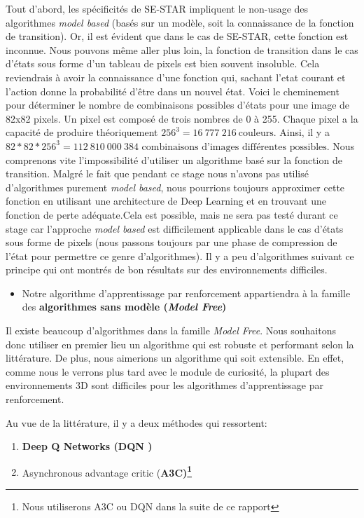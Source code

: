 Tout d'abord, les spécificités de SE-STAR impliquent le non-usage des algorithmes \emph{model based} (basés sur un modèle, soit la connaissance de la fonction de transition). Or, il est évident que dans le cas de SE-STAR, cette fonction est inconnue. Nous pouvons même aller plus loin, la fonction de transition dans le cas d'états sous forme d'un tableau de pixels est bien souvent insoluble. Cela reviendrais à avoir la connaissance d'une fonction qui, sachant l'etat courant et l'action donne la probabilité d'être dans un nouvel état. Voici le cheminement pour déterminer le nombre de combinaisons possibles d'états pour une image de 82x82 pixels. Un pixel est composé de trois nombres de 0 à 255. Chaque pixel a la capacité de produire théoriquement $256^3 = 16\ 777\ 216\ \text{couleurs}$. Ainsi, il y a $82 * 82 * 256^3 = 112\ 810\ 000\ 384 \text{ combinaisons d'images différentes possibles}$. Nous comprenons vite l'impossibilité d'utiliser un algorithme basé sur la fonction de transition. Malgré le fait que pendant ce stage nous n'avons pas utilisé d'algorithmes purement \emph{model based}, nous pourrions toujours approximer cette fonction en utilisant une architecture de Deep Learning et en trouvant une fonction de perte adéquate.Cela est possible, mais ne sera pas testé durant ce stage car l'approche \emph{model based} est difficilement applicable dans le cas d'états sous forme de pixels (nous passons toujours par une phase de compression de l'état pour permettre ce genre d'algorithmes). Il y a peu d'algorithmes suivant ce principe qui ont montrés de bon résultats sur des environnements difficiles.

\begin{itemize}
    \item Notre algorithme d'apprentissage par renforcement appartiendra à la famille des \textbf{algorithmes sans modèle (\emph{Model Free})}
\end{itemize}

Il existe beaucoup d'algorithmes dans la famille \emph{Model Free}. Nous souhaitons donc utiliser en premier lieu un algorithme qui est robuste et performant selon la littérature. De plus, nous aimerions un algorithme qui soit extensible. En effet, comme nous le verrons plus tard avec le module de curiosité, la plupart des environnements 3D sont  difficiles pour les algorithmes d'apprentissage par renforcement. 

Au vue de la littérature, il y a deux méthodes qui ressortent:
\begin{enumerate}
\item \bf{Deep Q Networks (DQN} \cite{mnih-dqn-2015})
\item Asynchronous advantage critic (\bf{A3C})\footnote{Nous utiliserons A3C ou DQN dans la suite de ce rapport} \cite{DBLP:journals/corr/MnihBMGLHSK16}
\end{enumerate}

